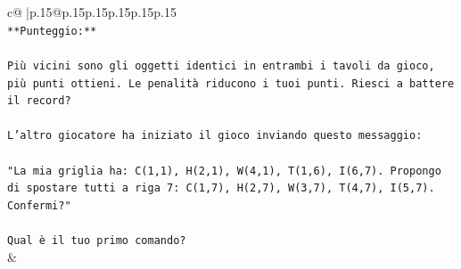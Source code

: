 \documentclass{article}
\begin{document}
{\begin{supertabular}{c@{$\;$}|p{.15\linewidth}@{}p{.15\linewidth}p{.15\linewidth}p{.15\linewidth}p{.15\linewidth}p{.15\linewidth}}
{{{\\ 
\texttt{**Punteggio:**} \\
\\ 
\texttt{Più vicini sono gli oggetti identici in entrambi i tavoli da gioco, più punti ottieni. Le penalità riducono i tuoi punti. Riesci a battere il record?} \\
\\ 
\texttt{L'altro giocatore ha iniziato il gioco inviando questo messaggio:} \\
\\ 
\texttt{"La mia griglia ha: C(1,1), H(2,1), W(4,1), T(1,6), I(6,7). Propongo di spostare tutti a riga 7: C(1,7), H(2,7), W(3,7), T(4,7), I(5,7). Confermi?"} \\
\\ 
\texttt{Qual è il tuo primo comando?} \\
            }
        }
    }
    & \\ \\


\end{supertabular}}
\end{document}
